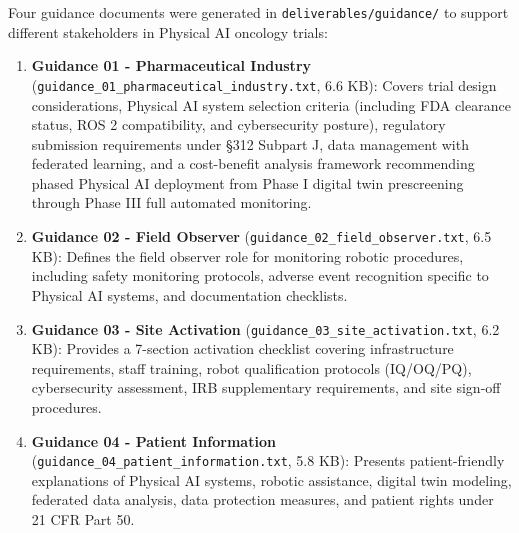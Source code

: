 Four guidance documents were generated in \texttt{deliverables/guidance/} to support different stakeholders in Physical AI oncology trials:

\begin{enumerate}[leftmargin=*]
\item \textbf{Guidance 01 - Pharmaceutical Industry} (\texttt{guidance\_01\_pharmaceutical\_industry.txt}, 6.6 KB): Covers trial design considerations, Physical AI system selection criteria (including FDA clearance status, ROS 2 compatibility, and cybersecurity posture), regulatory submission requirements under \S312 Subpart J, data management with federated learning, and a cost-benefit analysis framework recommending phased Physical AI deployment from Phase I digital twin prescreening through Phase III full automated monitoring.

\item \textbf{Guidance 02 - Field Observer} (\texttt{guidance\_02\_field\_observer.txt}, 6.5 KB): Defines the field observer role for monitoring robotic procedures, including safety monitoring protocols, adverse event recognition specific to Physical AI systems, and documentation checklists.

\item \textbf{Guidance 03 - Site Activation} (\texttt{guidance\_03\_site\_activation.txt}, 6.2 KB): Provides a 7-section activation checklist covering infrastructure requirements, staff training, robot qualification protocols (IQ/OQ/PQ), cybersecurity assessment, IRB supplementary requirements, and site sign-off procedures.

\item \textbf{Guidance 04 - Patient Information} (\texttt{guidance\_04\_patient\_information.txt}, 5.8 KB): Presents patient-friendly explanations of Physical AI systems, robotic assistance, digital twin modeling, federated data analysis, data protection measures, and patient rights under 21 CFR Part 50.
\end{enumerate}

